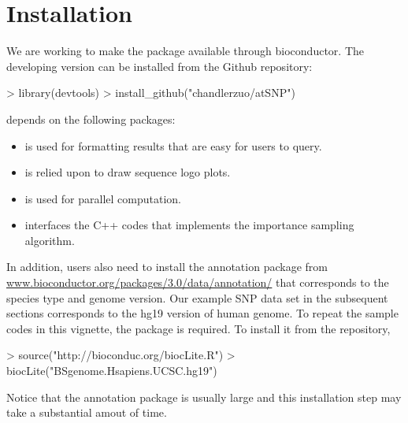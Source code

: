 \documentclass[a4paper,10pt]{article}
\begin{document}
\section{Installation}

We are working to make the package available through bioconductor. The developing version can be installed from the Github repository:

\begin{Schunk}
\begin{Sinput}
> library(devtools)
> install_github("chandlerzuo/atSNP")
\end{Sinput}
\end{Schunk}

 depends on the following \R{} packages:

\begin{itemize}
\item {} is used for formatting results that are easy for users to query.
\item {} is relied upon to draw sequence logo plots.
\item {} is used for parallel computation.
\item {} interfaces the C++ codes that implements the importance sampling algorithm.
\end{itemize}
  
In addition, users also need to install the annotation package from \url{www.bioconductor.org/packages/3.0/data/annotation/} that corresponds to the species type and genome version. Our example SNP data set in the subsequent sections corresponds to the hg19 version of human genome. To repeat the sample codes in this vignette, the  package is required. To install it from the \Bioconductor{} repository,

\begin{Schunk}
\begin{Sinput}
> source("http://bioconduc.org/biocLite.R")
> biocLite("BSgenome.Hsapiens.UCSC.hg19")
\end{Sinput}
\end{Schunk}

Notice that the annotation package is usually large and this installation step may take a substantial amout of time.

\end{document}
